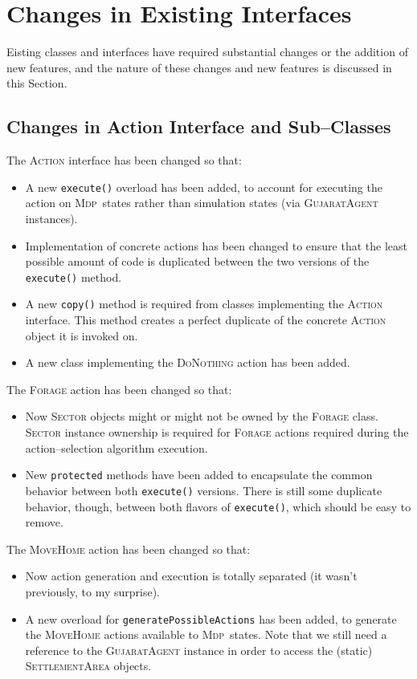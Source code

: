 \documentclass[a4paper,10pt]{article}
\newcommand{\mdp}{\textsc{Mdp}}
\begin{document}
\section{Changes in Existing Interfaces}

Eisting classes and interfaces have required substantial changes or the addition of new features, and the nature
of these changes and new features is discussed in this Section.

\subsection{Changes in Action Interface and Sub--Classes}
\label{changes_actions}

The \textsc{Action} interface has been changed so that:
\begin{itemize}
\item A new \texttt{execute()} overload has been added, to account for executing the action on \mdp~states rather
than simulation states (via \textsc{GujaratAgent} instances).
\item Implementation of concrete actions has been changed to ensure that the least possible amount of code is
duplicated between the two versions of the \texttt{execute()} method.
\item A new \texttt{copy()} method is required from classes implementing the \textsc{Action} interface. This method
creates a perfect duplicate of the concrete \textsc{Action} object it is invoked on.
\item A new class implementing the \textsc{DoNothing} action has been added.
\end{itemize}

The \textsc{Forage} action has been changed so that:
\begin{itemize}
\item Now \textsc{Sector} objects might or might not be owned by the \textsc{Forage} class. \textsc{Sector} instance
ownership is required for \textsc{Forage} actions required during the action--selection algorithm execution.
\item New \texttt{protected} methods have been added to encapsulate the common behavior between both \texttt{execute()}
versions. There is still some duplicate behavior, though, between both flavors of \texttt{execute()}, which should
be easy to remove.
\end{itemize}

The \textsc{MoveHome} action has been changed so that:
\begin{itemize}
\item Now action generation and execution is totally separated (it wasn't previously, to my surprise).
\item A new overload for \texttt{generatePossibleActions} has been added, to generate the \textsc{MoveHome} actions
available to \mdp~states. Note that we still need a reference to the \textsc{GujaratAgent} instance in order to
access the (static) \textsc{SettlementArea} objects.
\end{itemize}
\end{document}
